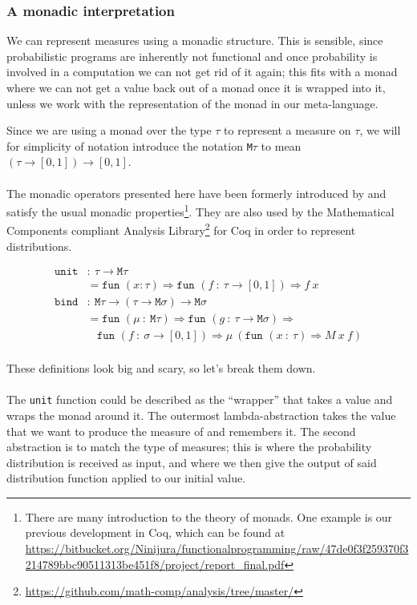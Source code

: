 \documentclass[11pt, leqno, titlepage]{article}
\theoremstyle{definition}
\begin{document}
\subsubsection{A monadic interpretation}
\label{sec:monad-interp}
We can represent measures using a monadic structure. This is sensible, since
probabilistic programs are inherently not functional and once probability is involved
in a computation we can not get rid of it again; this fits with a monad where we can
not get a value back out of a monad once it is wrapped into it, unless we work with
the representation of the monad in our meta-language.

Since we are using a monad over the type $\tau$ to represent a measure on $\tau$, we
will for simplicity of notation introduce the notation \texttt{M}$\tau$ to mean 
$(\tau\to[0,1])\to[0,1]$.\\ 
\\
The monadic operators presented here have been formerly introduced by \cite{rml-paper}
and satisfy the usual monadic properties\footnote{There are many introduction to the
theory of monads. One example is our previous development in Coq, which can be found
at
\url{https://bitbucket.org/Ninijura/functionalprogramming/raw/47de0f3f259370f3214789bbc90511313be451f8/project/report_final.pdf}}. They
are also used by the Mathematical Components compliant Analysis Library\footnote
{\url{https://github.com/math-comp/analysis/tree/master/}} for Coq in order to
represent distributions.

\begin{align*}
  \texttt{unit} & :~ \tau\to\texttt{M}\tau\\
                & = \texttt{fun }(x:\tau)\Rightarrow
                  \texttt{fun }(f~:~\tau\to[0,1])\Rightarrow f~x\\
  \texttt{bind} & :~\texttt{M}\tau\to(\tau\to\texttt{M}\sigma)\to\texttt{M}\sigma\\
                & = \texttt{fun }(\mu~:~\texttt{M}\tau)\Rightarrow \texttt{fun }
                  (g~:~\tau\to\texttt{M}\sigma) \Rightarrow\\
                & ~~~~\texttt{fun }(f~:~\sigma\to[0,1])\Rightarrow \mu~ (\texttt{fun
                  }(x~:~\tau)\Rightarrow M~x~f)
\end{align*}
\\
These definitions look big and scary, so let's break them down.
\\ \\
The \texttt{unit} function could be described as the ``wrapper'' that takes a value
and wraps the monad around it. The outermost lambda-abstraction takes the value that
we want to produce the measure of and remembers it. The second abstraction is to
match the type of measures; this is where the probability distribution is received as
input, and where we then give the output of said distribution function applied to our
initial value.
\end{document}
